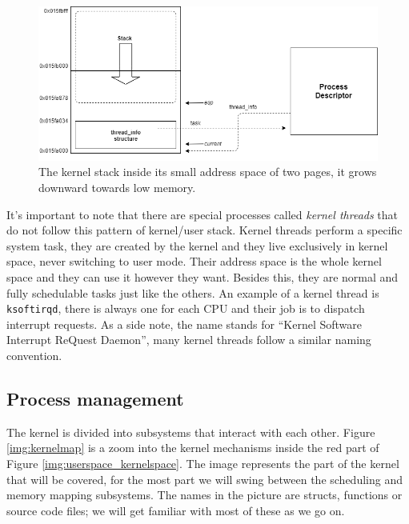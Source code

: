 \documentclass[10pt]{book}
\begin{document}
\begin{figure}[ht]
\includegraphics[width=\textwidth]{images/stack.png}
\caption{The kernel stack inside its small address space of two pages, it grows downward towards low memory. }
\label{img:stack}
\end{figure}

It's important to note that there are special processes called \textit{kernel threads} that do not follow this pattern of kernel/user stack. Kernel threads perform a specific system task, they are created by the kernel and they live exclusively in kernel space, never switching to user mode. Their address space is the whole kernel space and they can use it however they want. Besides this, they are normal and fully schedulable tasks just like the others. An example of a kernel thread is \verb|ksoftirqd|, there is always one for each CPU and their job is to dispatch interrupt requests. As a side note, the name stands for ``Kernel Software Interrupt ReQuest Daemon'', many kernel threads follow a similar naming convention. %
\subsection{Process management}
The kernel is divided into subsystems that interact with each other. Figure \ref{img:kernelmap} is a zoom into the kernel mechanisms inside the red part of Figure \ref{img:userspace_kernelspace}. The image represents the part of the kernel that will be covered, for the most part we will swing between the scheduling and memory mapping subsystems. The names in the picture are structs, functions or source code files; we will get familiar with most of these as we go on.
\end{document}
